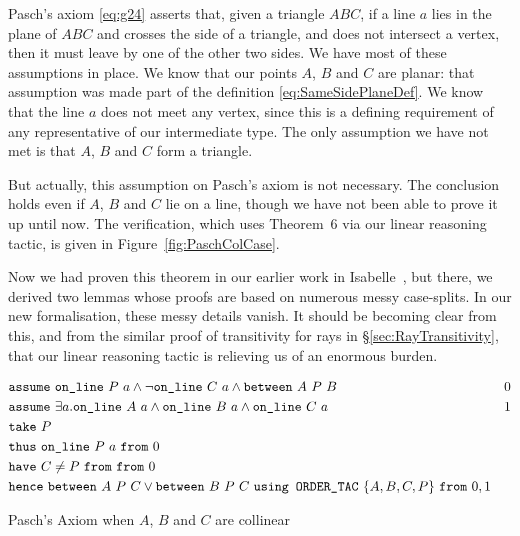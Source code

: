 Pasch's axiom \eqref{eq:g24} asserts that, given a triangle $ABC$, if a line $a$ lies in the plane of $ABC$ and crosses the side of a triangle, and does not intersect a vertex, then it must leave by one of the other two sides. We have most of these assumptions in place. We know that our points $A$, $B$ and $C$ are planar: that assumption was made part of the definition \eqref{eq:SameSidePlaneDef}. We know that the line $a$ does not meet any vertex, since this is a defining requirement of any representative of our intermediate type. The only assumption we have not met is that $A$, $B$ and $C$ form a triangle.

But actually, this assumption on Pasch's axiom is not necessary. The conclusion holds even if $A$, $B$ and $C$ lie on a line, though we have not been able to prove it up until now. The verification, which uses Theorem~6 via our linear reasoning tactic, is given in Figure~\ref{fig:PaschColCase}. 

Now we had proven this theorem in our earlier work in Isabelle~\cite{ScottMScThesis}, but there, we derived two lemmas whose proofs are based on numerous messy case-splits. In our new formalisation, these messy details vanish. It should be becoming clear from this, and from the similar proof of transitivity for rays in \S\ref{sec:RayTransitivity}, that our linear reasoning tactic is relieving us of an enormous burden.

\begin{boxedfigure}
  \begin{align*}
    & \code{assume}\ \code{on\_line}\ P\ a\wedge\neg\code{on\_line}\ C\ a \wedge \between{A}{P}{B} & 0\\
    & \code{assume}\ \exists a. \code{on\_line}\ A\ a\wedge\code{on\_line}\ B\ a\wedge\code{on\_line}\ C\ a&1\\
    & \code{take}\ P\\
    & \code{thus}\ \code{on\_line}\ P\ a\ \code{from}\ 0\\
    & \code{have}\ C \neq P\ \code{from}\ \code{from}\ 0\\
    & \code{hence}\ \between{A}{P}{C} \vee \between{B}{P}{C}\ \code{using ORDER\_TAC}\ \{A,B,C,P\}\ \code{from}\ 0,1
  \end{align*}
  \caption{Pasch's Axiom when $A$, $B$ and $C$ are collinear}
  \label{fig:PaschColCase}
\end{boxedfigure}

